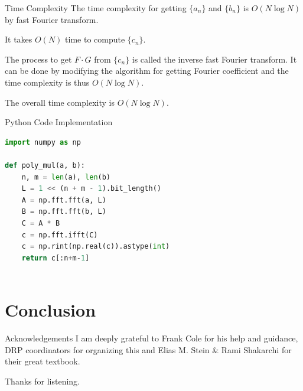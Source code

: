 \documentclass{beamer}
\begin{document}
\begin{frame}{Time Complexity}
    The time complexity for getting $\{a_n\}$ and $\{b_n\}$ is $O(N \log N)$ by fast Fourier transform.

    \pause

    It takes $O(N)$ time to compute $\{c_n\}$.

    \pause

    The process to get $F \cdot G$ from $\{c_n\}$ is called the inverse fast Fourier transform. It can be done by modifying the algorithm for getting Fourier coefficient and the time complexity is thus $O(N \log N)$.

    \pause

    The overall time complexity is $O(N \log N)$.
\end{frame}

\begin{frame}[fragile]{Python Code Implementation}
    \begin{lstlisting}[language=Python]
import numpy as np
   
def poly_mul(a, b):
    n, m = len(a), len(b)
    L = 1 << (n + m - 1).bit_length()
    A = np.fft.fft(a, L)
    B = np.fft.fft(b, L)
    C = A * B
    c = np.fft.ifft(C)
    c = np.rint(np.real(c)).astype(int)
    return c[:n+m-1]
        
    \end{lstlisting}
\end{frame}

\section{Conclusion}

\begin{frame}{Acknowledgements}
    I am deeply grateful to Frank Cole for his help and guidance, DRP coordinators for organizing this and Elias M. Stein \& Rami Shakarchi for their great textbook.

    \pause

    \vspace{1em}

    Thanks for listening.
\end{frame}
\end{document}
